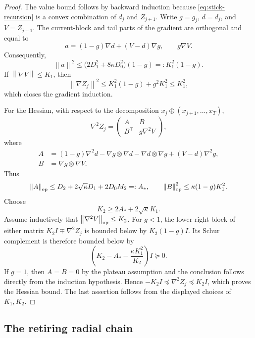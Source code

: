\documentclass[11pt,a4paper]{article}
\newcommand{\norm}[1]{\left\lVert #1\right\rVert}
\theoremstyle{remark}
\begin{document}
\begin{proof}
The value bound follows by backward induction because
\eqref{eq:stick-recursion} is a convex combination of $d_j$ and $Z_{j+1}$.
Write $g=g_j$, $d=d_j$, and $V=Z_{j+1}$.  The current-block and tail parts of
the gradient are orthogonal and equal to
\[
 a=(1-g)\nabla d+(V-d)\nabla g,
 \qquad
 g\nabla V.
\]
Consequently,
\[
 \norm a^2
 \le \bigl(2D_1^2+8\kappa D_0^2\bigr)(1-g)
 =:K_1^2(1-g).
\]
If $\norm{\nabla V}\le K_1$, then
\[
 \norm{\nabla Z_j}^2
 \le K_1^2(1-g)+g^2K_1^2
 \le K_1^2,
\]
which closes the gradient induction.

For the Hessian, with respect to the decomposition
$x_j\oplus(x_{j+1},\ldots,x_T)$,
\begin{equation}
 \nabla^2Z_j=
 \begin{pmatrix}
 A&B\\ B^\top&g\nabla^2V
 \end{pmatrix},
 \label{eq:stick-hessian-block}
\end{equation}
where
\begin{align*}
 A&=(1-g)\nabla^2d
 -\nabla g\otimes\nabla d-\nabla d\otimes\nabla g
 +(V-d)\nabla^2g,\\
 B&=\nabla g\otimes\nabla V.
\end{align*}
Thus
\[
 \norm{A}_{\rm op}\le
 D_2+2\sqrt\kappa D_1+2D_0M_2=:A_*,
 \qquad
 \norm{B}_{\rm op}^2\le\kappa(1-g)K_1^2.
\]
Choose
\[
 K_2\ge 2A_*+2\sqrt\kappa K_1.
\]
Assume inductively that $\norm{\nabla^2V}_{\rm op}\le K_2$.  For $g<1$,
the lower-right block of either matrix
$K_2I\mp\nabla^2Z_j$ is bounded below by
$K_2(1-g)I$.  Its Schur complement is therefore bounded below by
\[
 \left(K_2-A_*-\frac{\kappa K_1^2}{K_2}\right)I\succeq0.
\]
If $g=1$, then $A=B=0$ by the plateau assumption and the conclusion follows
directly from the induction hypothesis.  Hence
$-K_2I\preceq\nabla^2Z_j\preceq K_2I$, which proves the Hessian bound.  The
last assertion follows from the displayed choices of $K_1,K_2$.
\end{proof}

\subsection{The retiring radial chain}
\end{document}
